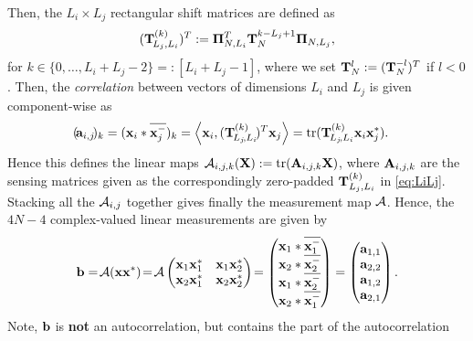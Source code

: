 \documentclass[conference]{IEEEtran}
\newcommand{\seeintern}[1]{\!} %
\begin{document}
%
\seeintern{See also definition in \eqref{eq:projNL}}%
%
Then, the $L_i\times L_j$ rectangular shift matrices are defined as 
%
\begin{align}
  (\mathbf T^{(k)}_{\!L_j,L_i})^T:={\mathbf \Pi}^T_{N,L_i}\mathbf T^{k-L_j+1}_{N}{\mathbf \Pi}_{N,L_j},
       \label{eq:LiLj}
\end{align}
%
for $k\in\{0,\dots,L_i+L_j-2\}=:[L_i+L_j-1]$, where we set $\mathbf T^l_N:=(\mathbf T^{-l}_N)^T$ if $l<0$. Then, the
\emph{correlation} between vectors of
dimensions $L_i$ and $L_j$ is given component-wise as 
%
\begin{align*}
  (\!{\mathbf a}_{i,j}\!)_k=({\mathbf x}_i*{\overline{{\mathbf x^{-}_j}}})_{k}&=  \left\langle {\ensuremath{\mathbf x}}_i,(\mathbf T^{(k)}_{\!L_j\!,L_i}\!)^T{\mathbf x}_j \right\rangle 
  = \operatorname{tr}(\mathbf T^{(k)}_{\!L_j\!,L_i}{\mathbf x}_i{\mathbf x}_j^*).
\end{align*}
%
\seeintern{See also \eqref{eq:discorr} and \eqref{eq:veccorr2}}%
%
Hence this defines the linear maps ${\mathcal{A}}_{i,j,k}({\mathbf X}):=\operatorname{tr}({\mathbf A}_{i,j,k}{\mathbf X})$, where ${\mathbf A}_{i,j,k}$ are the 
sensing matrices given as the correspondingly  zero-padded $\mathbf T_{L_j,L_i}^{(k)}$ in \eqref{eq:LiLj}.
%
%
Stacking all the ${\mathcal{A}}_{i,j}$ together gives finally the measurement map ${\mathcal{A}}$.
%
Hence, the $4N-4$ complex-valued linear measurements are
given by
%
\begin{align}
   {\ensuremath{\mathbf b}}=\!{\mathcal{A}}({\mathbf x}{\mathbf x}^*)\!=\!
        {\mathcal{A}}\begin{pmatrix}
        {\ensuremath{\mathbf x}}_1{\mathbf x}_1^* & {\mathbf x}_1{\mathbf x}_2^*\\
        {\mathbf x}_2{\mathbf x}_1^* & {\mathbf x}_2{\mathbf x}_2^*\end{pmatrix}\!
    =
    \begin{pmatrix} 
      {\ensuremath{\mathbf x}_1}*{\overline{{\mathbf x}_1^{-}}} \\ 
      {\mathbf x_2}*{\overline{{\mathbf x_2^{-}}}}\\
      {\mathbf x_1}*{\overline{{\mathbf x_2^{-}}}} \\
      {\mathbf x_2}*{\overline{{\mathbf x}_1^{-}}}
    \end{pmatrix}=\begin{pmatrix}{\ensuremath{\mathbf a}}_{1,1}\\{\mathbf a}_{2,2}\\{\mathbf a}_{1,2}\\{\mathbf a}_{2,1}\end{pmatrix}.\label{eq:3Nb}
\end{align}
%
Note, ${\mathbf b}$ is {\bfseries not} an autocorrelation, but contains the part of the autocorrelation 
\end{document}
